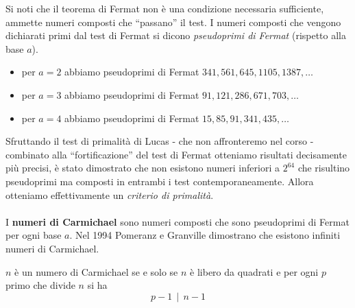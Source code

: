 \begin{osservazione}
	Si noti che il teorema di Fermat non è una condizione necessaria sufficiente, ammette numeri composti che \enquote{passano} il test. I numeri composti che vengono dichiarati primi dal test di Fermat si dicono \textit{pseudoprimi di Fermat} (rispetto alla base $a$).
	\begin{itemize}
		\item per $a=2$ abbiamo pseudoprimi di Fermat $341,561,645,1105,1387,\dots$
		\item per $a=3$ abbiamo pseudoprimi di Fermat $91,121,286,671,703,\dots$
		\item per $a=4$ abbiamo pseudoprimi di Fermat $15,85,91,341,435,\dots$
	\end{itemize}
Sfruttando il test di primalità di Lucas - che non affronteremo nel corso - combinato alla \enquote{fortificazione} del test di Fermat otteniamo risultati decisamente più precisi, è stato dimostrato che non esistono numeri inferiori a $2^{64}$ che risultino pseudoprimi ma composti in entrambi i test contemporaneamente. Allora otteniamo effettivamente un \textit{criterio di primalità}. \\ \\
I \textbf{numeri di Carmichael} sono numeri composti che sono pseudoprimi di Fermat per ogni base $a$. Nel 1994 Pomeranz e Granville dimostrano che esistono infiniti numeri di Carmichael.
\end{osservazione}
\begin{teorema}
	$n$ è un numero di Carmichael se e solo se $n$ è libero da quadrati e per ogni $p$ primo che divide $n$ si ha
	\begin{equation*}
	p-1 \, \mid \, n-1
	\end{equation*}
\end{teorema}
